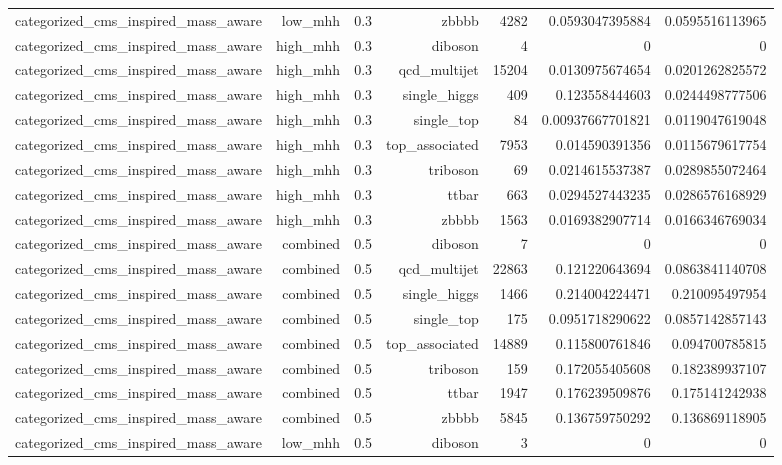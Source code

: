 \begin{table}[htbp]
{\begin{tabular}{lrrrrrr}
categorized\_cms\_inspired\_mass\_aware & low\_mhh & 0.3 & zbbbb & 4282 & 0.0593047395884 & 0.0595516113965 \\
categorized\_cms\_inspired\_mass\_aware & high\_mhh & 0.3 & diboson & 4 & 0 & 0 \\
categorized\_cms\_inspired\_mass\_aware & high\_mhh & 0.3 & qcd\_multijet & 15204 & 0.0130975674654 & 0.0201262825572 \\
categorized\_cms\_inspired\_mass\_aware & high\_mhh & 0.3 & single\_higgs & 409 & 0.123558444603 & 0.0244498777506 \\
categorized\_cms\_inspired\_mass\_aware & high\_mhh & 0.3 & single\_top & 84 & 0.00937667701821 & 0.0119047619048 \\
categorized\_cms\_inspired\_mass\_aware & high\_mhh & 0.3 & top\_associated & 7953 & 0.014590391356 & 0.0115679617754 \\
categorized\_cms\_inspired\_mass\_aware & high\_mhh & 0.3 & triboson & 69 & 0.0214615537387 & 0.0289855072464 \\
categorized\_cms\_inspired\_mass\_aware & high\_mhh & 0.3 & ttbar & 663 & 0.0294527443235 & 0.0286576168929 \\
categorized\_cms\_inspired\_mass\_aware & high\_mhh & 0.3 & zbbbb & 1563 & 0.0169382907714 & 0.0166346769034 \\
categorized\_cms\_inspired\_mass\_aware & combined & 0.5 & diboson & 7 & 0 & 0 \\
categorized\_cms\_inspired\_mass\_aware & combined & 0.5 & qcd\_multijet & 22863 & 0.121220643694 & 0.0863841140708 \\
categorized\_cms\_inspired\_mass\_aware & combined & 0.5 & single\_higgs & 1466 & 0.214004224471 & 0.210095497954 \\
categorized\_cms\_inspired\_mass\_aware & combined & 0.5 & single\_top & 175 & 0.0951718290622 & 0.0857142857143 \\
categorized\_cms\_inspired\_mass\_aware & combined & 0.5 & top\_associated & 14889 & 0.115800761846 & 0.094700785815 \\
categorized\_cms\_inspired\_mass\_aware & combined & 0.5 & triboson & 159 & 0.172055405608 & 0.182389937107 \\
categorized\_cms\_inspired\_mass\_aware & combined & 0.5 & ttbar & 1947 & 0.176239509876 & 0.175141242938 \\
categorized\_cms\_inspired\_mass\_aware & combined & 0.5 & zbbbb & 5845 & 0.136759750292 & 0.136869118905 \\
categorized\_cms\_inspired\_mass\_aware & low\_mhh & 0.5 & diboson & 3 & 0 & 0 \\

\end{tabular}}
\end{table}
